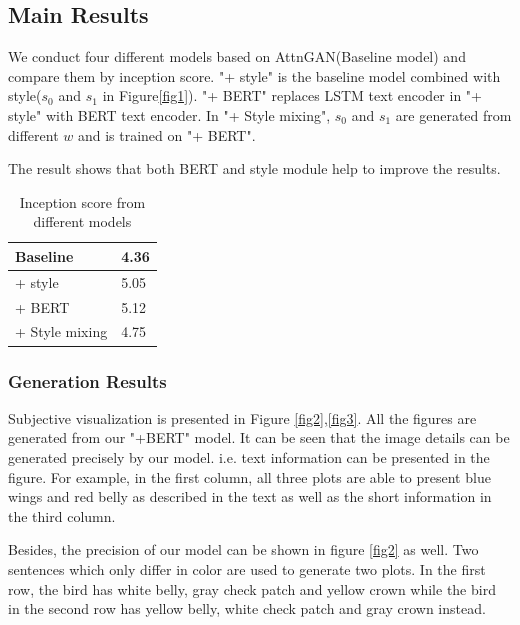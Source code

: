 \documentclass{article}
\begin{document}
\subsection{Main Results}

We conduct four different models based on AttnGAN(Baseline model) and compare them by inception score.
"+ style" is the baseline model combined with style($s_0$ and $s_1$ in Figure\ref{fig1}).
"+ BERT" replaces LSTM text encoder in "+ style"  with BERT text encoder.
In "+ Style mixing", $s_0$ and $s_1$ are generated from different $w$ and is trained on "+ BERT".

The result shows that both BERT and style module help to improve the results.

\begin{table}[h!]
\centering
\begin{tabular}{ | p{2cm} || p{1cm} | } 
\hline
Baseline & 4.36  \\ 
\hline
+ style & 5.05 \\ 
\hline
+ BERT & 5.12 \\ 
\hline
+ Style mixing & 4.75 \\ 
\hline
\end{tabular}
\caption{Inception score from different models}
\label{table:1}
\end{table}

\subsubsection{Generation Results}

Subjective visualization is presented in Figure \ref{fig2},\ref{fig3}. All the figures are generated from our "+BERT" model. 
It can be seen that the image details can be generated precisely by our model. i.e. text information can be presented in the figure. For example, in the first column, all three plots are able to present blue wings and red belly as described in the text as well as the short information in the third column.

Besides, the precision of our model can be shown in figure \ref{fig2} as well. Two sentences which only differ in color are used to generate two plots. In the first row, the bird has white belly, gray check patch and yellow crown while the bird in the second row has yellow belly, white check patch and gray crown instead.
\end{document}
